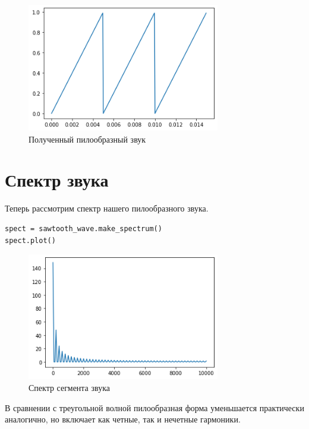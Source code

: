 \documentclass[a4paper,12pt]{report}
\begin{document}
\begin{figure}[H]
        \centering
        \includegraphics[width=0.75\textwidth]{1.png}
        \caption{Полученный пилообразный звук}
        \label{fig:fig2_1}
\end{figure}
    


\section{Спектр звука}

Теперь рассмотрим спектр нашего пилообразного звука.

\begin{lstlisting}[caption=Спектр звука]
spect = sawtooth_wave.make_spectrum()
spect.plot()
\end{lstlisting}

\begin{figure}[H]
        \centering
        \includegraphics[width=0.75\textwidth]{2.png}
        \caption{Спектр сегмента звука}
        \label{fig:fig2_2}
\end{figure}

В сравнении с треугольной волной пилообразная форма уменьшается практически аналогично, но включает как четные, так и нечетные гармоники.
\end{document}
